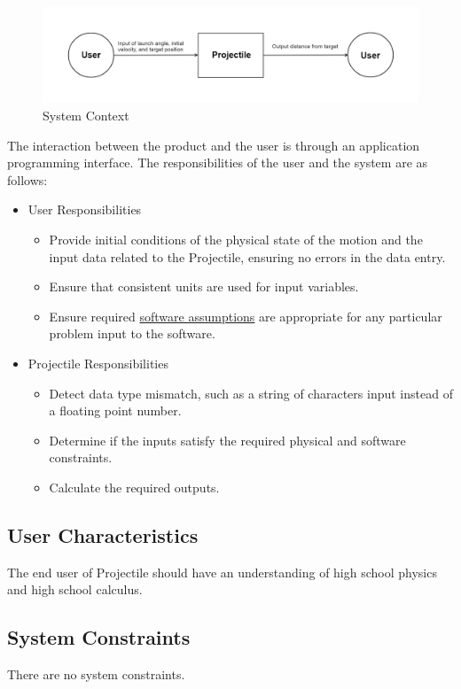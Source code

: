 \documentclass[12pt]{article}
\begin{document}
\begin{figure}[H]
\begin{center}
\includegraphics[width=\textwidth]{../../../../datafiles/projectile/SystemContextFigure.png}
\caption{System Context}
\label{Figure:sysCtxDiag}
\end{center}
\end{figure}
The interaction between the product and the user is through an application programming interface. The responsibilities of the user and the system are as follows:

\begin{itemize}
\item{User Responsibilities}
\begin{itemize}
\item{Provide initial conditions of the physical state of the motion and the input data related to the Projectile, ensuring no errors in the data entry.}
\item{Ensure that consistent units are used for input variables.}
\item{Ensure required \hyperref[Sec:Assumps]{software assumptions} are appropriate for any particular problem input to the software.}
\end{itemize}
\item{Projectile Responsibilities}
\begin{itemize}
\item{Detect data type mismatch, such as a string of characters input instead of a floating point number.}
\item{Determine if the inputs satisfy the required physical and software constraints.}
\item{Calculate the required outputs.}
\end{itemize}
\end{itemize}
\subsection{User Characteristics}
\label{Sec:UserChars}
The end user of Projectile should have an understanding of high school physics and high school calculus.

\subsection{System Constraints}
\label{Sec:SysConstraints}
There are no system constraints.
\end{document}
